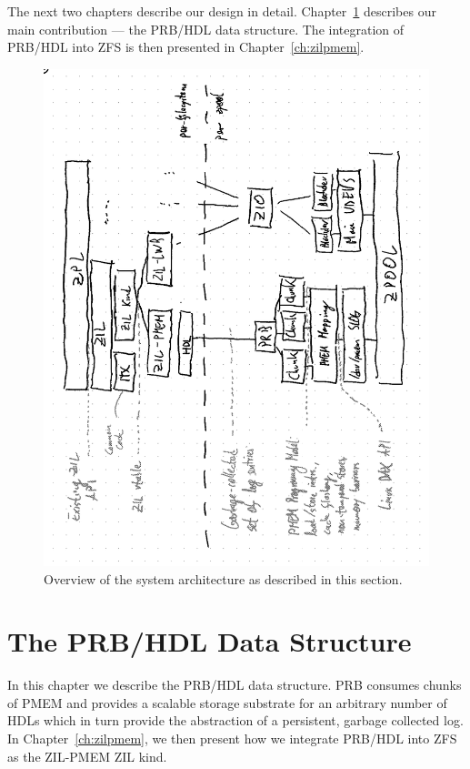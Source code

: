 \documentclass[12pt,a4paper,twoside]{book}
\begin{document}
The next two chapters describe our design in detail.
Chapter~\ref{ch:prbhdl} describes our main contribution --- the PRB/HDL data structure.
The integration of PRB/HDL into ZFS is then presented in Chapter~\ref{ch:zilpmem}.

\begin{figure}[H]
    \includegraphics{fig/zilpmem_architecture_overview}
    \caption{Overview of the system architecture as described in this section.}
    \label{fig:zilpmem_architecture}
\end{figure}

\chapter{The PRB/HDL Data Structure}\label{ch:prbhdl}

In this chapter we describe the PRB/HDL data structure.
PRB consumes chunks of PMEM and provides a scalable storage substrate for an arbitrary number of HDLs which in turn provide the abstraction of a persistent, garbage collected log.
In Chapter~\ref{ch:zilpmem}, we then present how we integrate PRB/HDL into ZFS as the ZIL-PMEM ZIL kind.
\end{document}
